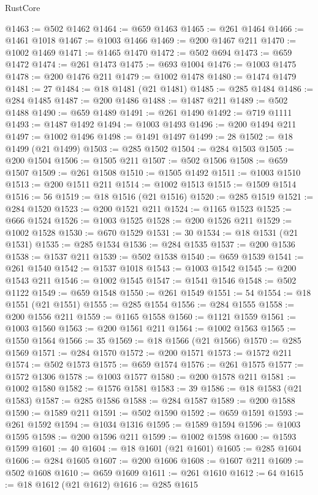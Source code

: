 \begin{lexlean}{RustCore}
\begin{coremodule}
@1463 := @502 @1462
@1464 := @659 @1463
@1465 := @261 @1464
@1466 := @1461 @1018
@1467 := @1003 @1466
@1469 := @200 @1467 @211
@1470 := @1002 @1469
@1471 := @1465 @1470
@1472 := @502 @694
@1473 := @659 @1472
@1474 := @261 @1473
@1475 := @693 @1004
@1476 := @1003 @1475
@1478 := @200 @1476 @211
@1479 := @1002 @1478
@1480 := @1474 @1479
@1481 := 27
@1484 := @18 @1481 (@21 @1481)
@1485 := @285 @1484
@1486 := @284 @1485
@1487 := @200 @1486
@1488 := @1487 @211
@1489 := @502 @1488
@1490 := @659 @1489
@1491 := @261 @1490
@1492 := @719 @1111
@1493 := @1487 @1492
@1494 := @1003 @1493
@1496 := @200 @1494 @211
@1497 := @1002 @1496
@1498 := @1491 @1497
@1499 := 28
@1502 := @18 @1499 (@21 @1499)
@1503 := @285 @1502
@1504 := @284 @1503
@1505 := @200 @1504
@1506 := @1505 @211
@1507 := @502 @1506
@1508 := @659 @1507
@1509 := @261 @1508
@1510 := @1505 @1492
@1511 := @1003 @1510
@1513 := @200 @1511 @211
@1514 := @1002 @1513
@1515 := @1509 @1514
@1516 := 56
@1519 := @18 @1516 (@21 @1516)
@1520 := @285 @1519
@1521 := @284 @1520
@1523 := @200 @1521 @211
@1524 := @1165 @1523
@1525 := @666 @1524
@1526 := @1003 @1525
@1528 := @200 @1526 @211
@1529 := @1002 @1528
@1530 := @670 @1529
@1531 := 30
@1534 := @18 @1531 (@21 @1531)
@1535 := @285 @1534
@1536 := @284 @1535
@1537 := @200 @1536
@1538 := @1537 @211
@1539 := @502 @1538
@1540 := @659 @1539
@1541 := @261 @1540
@1542 := @1537 @1018
@1543 := @1003 @1542
@1545 := @200 @1543 @211
@1546 := @1002 @1545
@1547 := @1541 @1546
@1548 := @502 @1122
@1549 := @659 @1548
@1550 := @261 @1549
@1551 := 54
@1554 := @18 @1551 (@21 @1551)
@1555 := @285 @1554
@1556 := @284 @1555
@1558 := @200 @1556 @211
@1559 := @1165 @1558
@1560 := @1121 @1559
@1561 := @1003 @1560
@1563 := @200 @1561 @211
@1564 := @1002 @1563
@1565 := @1550 @1564
@1566 := 35
@1569 := @18 @1566 (@21 @1566)
@1570 := @285 @1569
@1571 := @284 @1570
@1572 := @200 @1571
@1573 := @1572 @211
@1574 := @502 @1573
@1575 := @659 @1574
@1576 := @261 @1575
@1577 := @1572 @1306
@1578 := @1003 @1577
@1580 := @200 @1578 @211
@1581 := @1002 @1580
@1582 := @1576 @1581
@1583 := 39
@1586 := @18 @1583 (@21 @1583)
@1587 := @285 @1586
@1588 := @284 @1587
@1589 := @200 @1588
@1590 := @1589 @211
@1591 := @502 @1590
@1592 := @659 @1591
@1593 := @261 @1592
@1594 := @1034 @1316
@1595 := @1589 @1594
@1596 := @1003 @1595
@1598 := @200 @1596 @211
@1599 := @1002 @1598
@1600 := @1593 @1599
@1601 := 40
@1604 := @18 @1601 (@21 @1601)
@1605 := @285 @1604
@1606 := @284 @1605
@1607 := @200 @1606
@1608 := @1607 @211
@1609 := @502 @1608
@1610 := @659 @1609
@1611 := @261 @1610
@1612 := 64
@1615 := @18 @1612 (@21 @1612)
@1616 := @285 @1615

\end{coremodule}
\end{lexlean}
